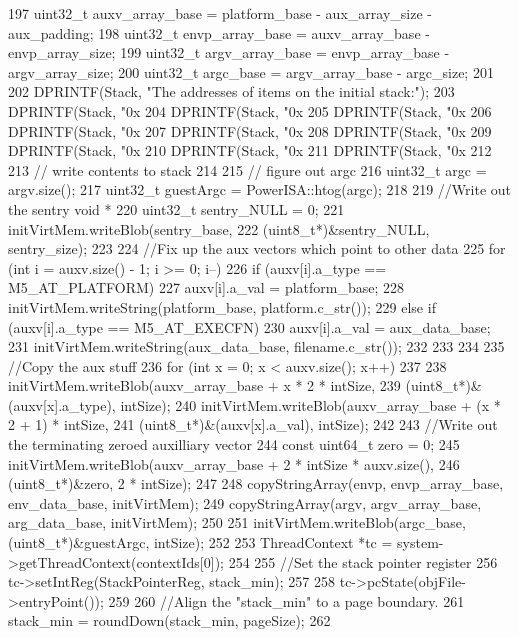 \begin{DoxyCode}
{197     uint32_t auxv_array_base = platform_base - aux_array_size - aux_padding;
198     uint32_t envp_array_base = auxv_array_base - envp_array_size;
199     uint32_t argv_array_base = envp_array_base - argv_array_size;
200     uint32_t argc_base = argv_array_base - argc_size;
201 
202     DPRINTF(Stack, "The addresses of items on the initial stack:\n");
203     DPRINTF(Stack, "0x%
204     DPRINTF(Stack, "0x%
205     DPRINTF(Stack, "0x%
206     DPRINTF(Stack, "0x%
207     DPRINTF(Stack, "0x%
208     DPRINTF(Stack, "0x%
209     DPRINTF(Stack, "0x%
210     DPRINTF(Stack, "0x%
211     DPRINTF(Stack, "0x%
212 
213     // write contents to stack
214 
215     // figure out argc
216     uint32_t argc = argv.size();
217     uint32_t guestArgc = PowerISA::htog(argc);
218 
219     //Write out the sentry void *
220     uint32_t sentry_NULL = 0;
221     initVirtMem.writeBlob(sentry_base,
222             (uint8_t*)&sentry_NULL, sentry_size);
223 
224     //Fix up the aux vectors which point to other data
225     for (int i = auxv.size() - 1; i >= 0; i--) {
226         if (auxv[i].a_type == M5_AT_PLATFORM) {
227             auxv[i].a_val = platform_base;
228             initVirtMem.writeString(platform_base, platform.c_str());
229         } else if (auxv[i].a_type == M5_AT_EXECFN) {
230             auxv[i].a_val = aux_data_base;
231             initVirtMem.writeString(aux_data_base, filename.c_str());
232         }
233     }
234 
235     //Copy the aux stuff
236     for (int x = 0; x < auxv.size(); x++)
237     {
238         initVirtMem.writeBlob(auxv_array_base + x * 2 * intSize,
239                 (uint8_t*)&(auxv[x].a_type), intSize);
240         initVirtMem.writeBlob(auxv_array_base + (x * 2 + 1) * intSize,
241                 (uint8_t*)&(auxv[x].a_val), intSize);
242     }
243     //Write out the terminating zeroed auxilliary vector
244     const uint64_t zero = 0;
245     initVirtMem.writeBlob(auxv_array_base + 2 * intSize * auxv.size(),
246             (uint8_t*)&zero, 2 * intSize);
247 
248     copyStringArray(envp, envp_array_base, env_data_base, initVirtMem);
249     copyStringArray(argv, argv_array_base, arg_data_base, initVirtMem);
250 
251     initVirtMem.writeBlob(argc_base, (uint8_t*)&guestArgc, intSize);
252 
253     ThreadContext *tc = system->getThreadContext(contextIds[0]);
254 
255     //Set the stack pointer register
256     tc->setIntReg(StackPointerReg, stack_min);
257 
258     tc->pcState(objFile->entryPoint());
259 
260     //Align the "stack_min" to a page boundary.
261     stack_min = roundDown(stack_min, pageSize);
262 }
\end{DoxyCode}
